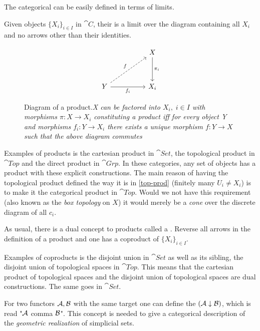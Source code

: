 \documentclass[../../main.tex]{subfiles}
\begin{document}
    The categorical  can be easily defined in terms of limits. 
    
    \begin{definition}
        Given objects $\{X_i\}_{i \in I}$ in $\cat{C}$, their  is a limit over the diagram containing all $X_i$ and no arrows other than their identities.
    \end{definition}

    \begin{figure}[H]
        \[
            \begin{tikzcd}[row sep = 8ex, column sep = 5em]
                & X \arrow[d, "\pi_i"] \\
                Y \arrow[ru,"f",dashed] \arrow[r,"f_i",swap] & X_i  
              \end{tikzcd}
        \]
        \caption{Diagram of a product.\textit{X can be factored into $X_i,\; i \in I$ with morphisms $\pi:X\to X_i$ constituting a product iff for every object Y and morphisms $f_i:Y\to X_i$ there exists a unique morphism $f:Y\to X$ such that the above diagram commutes}}
        \label{fig:product}
    \end{figure}
    
    Examples of products is the cartesian product in $\cat{Set}$, the topological product in $\cat{Top}$ and the direct product in $\cat{Grp}$. In these categories, any set of objects has a product with these explicit constructions. The main reason of having the topological product defined the way it is in \ref{top-prod} (finitely many $U_i \neq X_i$) is to make it the categorical product in $\cat{Top}$. Would we not have this requirement (also known as the \emph{box topology} on $X$) it would merely be a \emph{cone} over the discrete diagram of all $c_i$.
    
    As usual, there is a dual concept to products called a . Reverse all arrows in the definition of a product and one has a coproduct of $\{X_i\}_{i\in I}$.

    Examples of coproducts is the disjoint union in $\cat{Set}$ as well as its sibling, the disjoint union of topological spaces in $\cat{Top}$. This means that the cartesian product of topological spaces and the disjoint union of topological spaces are dual constructions. The same goes in $\cat{Set}$.

    For two functors $\mathcal{A}, \mathcal{B}$ with the same target one can define the  $(\mathcal{A} \downarrow \mathcal{B})$, which is read "$\mathcal{A}$ comma $\mathcal{B}$". This concept is needed to give a categorical description of the \textit{geometric realization} of simplicial sets.
\end{document}
